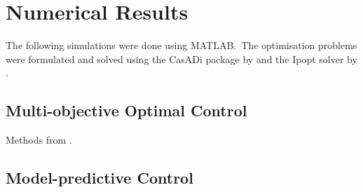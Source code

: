 \section{Numerical Results}

The following simulations were done using MATLAB.\ 
The optimisation problems were formulated and solved using the CasADi package by \cite{Andersson2019casadi} and the Ipopt solver by \cite{Waechter2006ipopt}.\ 



\subsection{Multi-objective Optimal Control}
Methods from \cite{Hoffmann2022moocp_wcdeg}.

\subsection{Model-predictive Control}